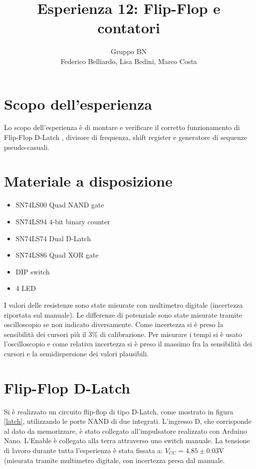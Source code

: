 \documentclass[10pt,a4paper]{article}
\author{Gruppo BN \\ Federico Belliardo, Lisa Bedini, Marco Costa}
\title{Esperienza 12: Flip-Flop e contatori}
\begin{document}
\maketitle

\section{Scopo dell'esperienza}
Lo scopo dell'esperienza è di montare e verificare il corretto funzionamento di  Flip-Flop D-Latch , divisore di frequenza, shift register e generatore di sequenze pseudo-casuali. %

\section{Materiale a disposizione}
\begin{itemize}
\item SN74LS00 Quad NAND gate
\item SN74LS94 4-bit binary counter
\item SN74LS74 Dual D-Latch
\item SN74LS86 Quad XOR gate
\item DIP switch
\item 4 LED
\end{itemize}
I valori delle resistenze sono state misurate con multimetro digitale (incertezza riportata sul manuale).
Le differenze di potenziale sono state misurate tramite oscilloscopio se non indicato diversamente. Come incertezza si è preso la sensibilità dei cursori più il 3\% di calibrazione.
Per misurare i tempi si è usato l'oscilloscopio e come relativa incertezza si è preso il massimo fra la sensibilità dei cursori e la semidispersione dei valori plausibili.
\section{Flip-Flop D-Latch}
Si è realizzato un circuito flip-flop di tipo D-Latch, come mostrato in figura \ref{latch}, utilizzando le porte NAND di due integrati. L'ingresso D, che corrisponde al dato da memorizzare, è stato collegato all'impulsatore realizzato con Arduino Nano. L'Enable è collegato alla terra attraverso uno switch manuale. La tensione di lavoro durante tutta l'esperienza è stata fissata a: $V_{CC} = 4.85 \pm 0.03$V (misurata tramite multimetro digitale, con incertezza presa dal manuale.\\ 
\end{document}
